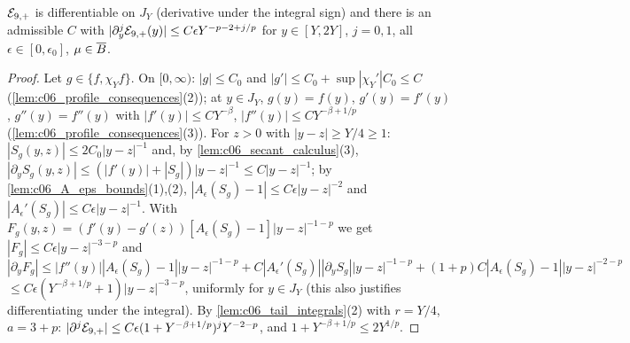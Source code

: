 \begin{lemma}
  \label{lem:c06_E9_positive}
  $\mathcal{E}_{9,+}$ is differentiable on $J_Y$ (derivative under the integral sign) and there is an admissible $C$ with
  $|\partial_y^j\mathcal{E}_{9,+}(y)|\le C\epsilon Y^{-p-2+j/p}$ for $y\in[Y,2Y]$, $j=0,1$, all $\epsilon\in[0,\epsilon_0]$, $\mu\in\overline{B}$.
\end{lemma}
\begin{proof}
  Let $g\in\{f,\chi_Yf\}$. On $[0,\infty)$: $|g|\le C_0$ and $|g'|\le C_0+\sup|\chi_Y'|C_0\le C$
  (\cref{lem:c06_profile_consequences}(2)); at $y\in J_Y$, $g(y)=f(y)$, $g'(y)=f'(y)$, $g''(y)=f''(y)$ with
  $|f'(y)|\le C Y^{-\beta}$, $|f''(y)|\le CY^{-\beta+1/p}$ (\cref{lem:c06_profile_consequences}(3)).
  For $z>0$ with $|y-z|\ge Y/4\geq1$: $|S_g(y,z)|\le2C_0|y-z|^{-1}$ and, by \cref{lem:c06_secant_calculus}(3),
  $|\partial_yS_g(y,z)|\le(|f'(y)|+|S_g|)|y-z|^{-1}\le C|y-z|^{-1}$; by \cref{lem:c06_A_eps_bounds}(1),(2),
  $|A_\epsilon(S_g)-1|\le C\epsilon|y-z|^{-2}$ and $|A_\epsilon'(S_g)|\le C\epsilon|y-z|^{-1}$.
  With $F_g(y,z)=(f'(y)-g'(z))[A_\epsilon(S_g)-1]|y-z|^{-1-p}$ we get $|F_g|\le C\epsilon|y-z|^{-3-p}$ and
  \[|\partial_yF_g|\le |f''(y)||A_\epsilon(S_g)-1||y-z|^{-1-p}+C|A_\epsilon'(S_g)||\partial_yS_g||y-z|^{-1-p}+(1+p)C|A_\epsilon(S_g)-1||y-z|^{-2-p}\]
  $\le C\epsilon(Y^{-\beta+1/p}+1)|y-z|^{-3-p}$, uniformly for $y\in J_Y$ (this also justifies differentiating under the integral).
  By \cref{lem:c06_tail_integrals}(2) with $r=Y/4$, $a=3+p$: $|\partial^j\mathcal{E}_{9,+}|\le C\epsilon(1+Y^{-\beta+1/p})^jY^{-2-p}$,
  and $1+Y^{-\beta+1/p}\le2Y^{1/p}$.
\end{proof}

